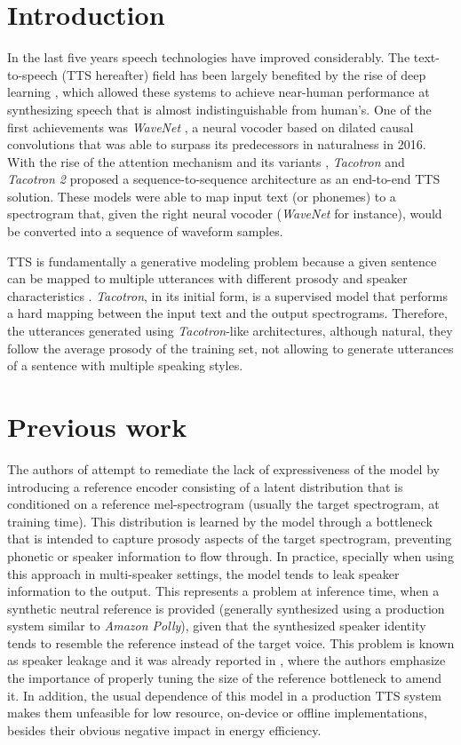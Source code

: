 \section{Introduction}
In the last five years speech technologies have improved considerably. The text-to-speech (TTS hereafter) field has been largely benefited by the rise of deep learning \autocite{Sisman2021}, which allowed these systems to achieve near-human performance at synthesizing speech that is almost indistinguishable from human's. One of the first achievements was \textit{WaveNet} \autocite{vanderoord2016}, a neural vocoder based on dilated causal convolutions that was able to surpass its predecessors in naturalness in 2016. With the rise of the attention mechanism and its variants \autocite{bahdanau2015,vaswani2017,chaudhari2019}, \textit{Tacotron} \autocite{Wang2017} and \textit{Tacotron 2} \autocite{Shen2018,liu2019b} proposed a sequence-to-sequence architecture as an end-to-end TTS solution. These models were able to map input text (or phonemes) to a spectrogram that, given the right neural vocoder (\textit{WaveNet} for instance), would be converted into a sequence of waveform samples.

TTS is fundamentally a generative modeling problem because a given sentence can be mapped to multiple utterances with different prosody and speaker characteristics \autocite{Taylor2009}. \textit{Tacotron}, in its initial form, is a supervised model that performs a hard mapping between the input text and the output spectrograms. Therefore, the utterances generated using \textit{Tacotron}-like architectures, although natural, they follow the average prosody of the training set, not allowing to generate utterances of a sentence with multiple speaking styles.

\section{Previous work}
The authors of \autocite{skerryryan2018} attempt to remediate the lack of expressiveness of the model by introducing a reference encoder consisting of a latent distribution that is conditioned on a reference mel-spectrogram (usually the target spectrogram, at training time). This distribution is learned by the model through a bottleneck that is intended to capture prosody aspects of the target spectrogram, preventing phonetic or speaker information to flow through. In practice, specially when using this approach in multi-speaker settings, the model tends to leak speaker information to the output. This represents a problem at inference time, when a synthetic neutral reference is provided (generally synthesized using a production system similar to \textit{Amazon Polly}), given that the synthesized speaker identity tends to resemble the reference instead of the target voice. This problem is known as speaker leakage and it was already reported in \autocite{skerryryan2018}, where the authors emphasize the importance of properly tuning the size of the reference bottleneck to amend it. In addition, the usual dependence of this model in a production TTS system makes them unfeasible for low resource, on-device or offline implementations, besides their obvious negative impact in energy efficiency.

